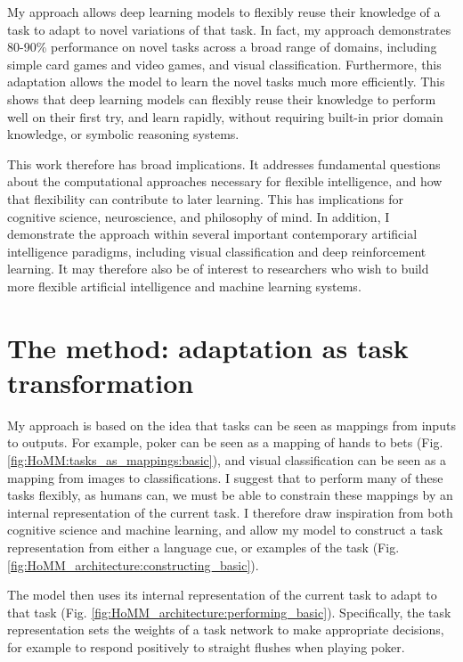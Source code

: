 \documentclass[12pt]{article}
\begin{document}
My approach allows deep learning models to flexibly reuse their knowledge of a task to adapt to novel variations of that task. In fact, my approach demonstrates 80-90\% performance on novel tasks across a broad range of domains, including simple card games and video games, and visual classification. Furthermore, this adaptation allows the model to learn the novel tasks much more efficiently. This shows that deep learning models can flexibly reuse their knowledge to perform well on their first try, and learn rapidly, without requiring built-in prior domain knowledge, or symbolic reasoning systems. 

This work therefore has broad implications. It addresses fundamental questions about the computational approaches necessary for flexible intelligence, and how that flexibility can contribute to later learning. This has implications for cognitive science, neuroscience, and philosophy of mind. In addition, I demonstrate the approach within several important contemporary artificial intelligence paradigms, including visual classification and deep reinforcement learning. It may therefore also be of interest to researchers who wish to build more flexible artificial intelligence and machine learning systems.

\section{The method: adaptation as task transformation}

My approach is based on the idea that tasks can be seen as mappings from inputs to outputs. For example, poker can be seen as a mapping of hands to bets (Fig. \ref{fig:HoMM:tasks_as_mappings:basic}), and visual classification can be seen as a mapping from images to classifications. I suggest that to perform many of these tasks flexibly, as humans can, we must be able to constrain these mappings by an internal representation of the current task. I therefore draw inspiration from both cognitive science and machine learning, and allow my model to construct a task representation from either a language cue, or examples of the task (Fig. \ref{fig:HoMM_architecture:constructing_basic}). 

The model then uses its internal representation of the current task to adapt to that task (Fig. \ref{fig:HoMM_architecture:performing_basic}). Specifically, the task representation sets the weights of a task network to make appropriate decisions, for example to respond positively to straight flushes when playing poker. 
\end{document}
